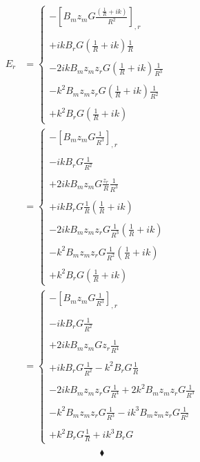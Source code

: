 \begin{align}
E_r&=  \left\{\begin{array}{l}-\left[B_mz_mG\frac{\left(\frac{1}{R} + ik\right)}{R^2}\right]_{,r}\\\\
+ikB_rG\left(\frac{1}{R} + ik\right)\frac{1}{R}\\\\-2ikB_mz_mz_rG\left(\frac{1}{R} + ik\right)\frac{1}{R^3}\\\\-k^2B_mz_mz_rG\left(\frac{1}{R} + ik\right)\frac{1}{R^2}\\\\+k^2B_rG\left(\frac{1}{R} + ik\right)
\end{array}\right.\\
&= \left\{\begin{array}{l} -\left[B_mz_mG\frac{1}{R^3}\right]_{,r}\\\\-ikB_rG\frac{1}{R^2}\\\\+2ikB_mz_mG\frac{z_r}{R}\frac{1}{R^3}\\\\+ikB_rG\frac{1}{R}\left(\frac{1}{R} + ik\right)\\\\-2ikB_mz_mz_rG\frac{1}{R^3}\left(\frac{1}{R} + ik\right)\\\\-k^2B_mz_mz_rG\frac{1}{R^2}\left(\frac{1}{R} + ik\right)\\\\+k^2B_rG\left(\frac{1}{R} + ik\right)
\end{array}\right.\\
&= \left\{\begin{array}{l} -\left[B_mz_mG\frac{1}{R^3}\right]_{,r}\\\\-ikB_rG\frac{1}{R^2}\\\\+2ikB_mz_mGz_r\frac{1}{R^4}\\\\+ikB_rG\frac{1}{R^2}-k^2B_rG\frac{1}{R}\\\\-2ikB_mz_mz_rG\frac{1}{R^4} +2k^2B_mz_mz_rG\frac{1}{R^3} \\\\-k^2B_mz_mz_rG\frac{1}{R^3} -ik^3B_mz_mz_rG\frac{1}{R^2}\\\\+k^2B_rG\frac{1}{R}+ ik^3B_rG
\end{array}\right.\\
\end{align}
$$\blacklozenge$$
\newpage





